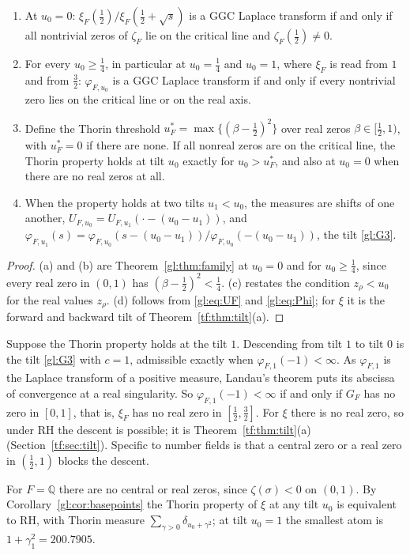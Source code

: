 \begin{corollary}\label{gl:cor:basepoints}
\begin{enumerate}
\item[(a)] At $u_0=0$: $\xi_F(\tfrac12)/\xi_F(\tfrac12+\sqrt s)$ is a GGC Laplace transform if and only if all nontrivial zeros of $\zeta_F$ lie on the critical line and $\zeta_F(\tfrac12)\neq0$.
\item[(b)] For every $u_0\ge\tfrac14$, in particular at $u_0=\tfrac14$ and $u_0=1$, where $\xi_F$ is read from $1$ and from $\tfrac32$: $\varphi_{F,u_0}$ is a GGC Laplace transform if and only if every nontrivial zero lies on the critical line or on the real axis.
\item[(c)] Define the Thorin threshold $u^*_F=\max\{(\beta-\tfrac12)^2\}$ over real zeros $\beta\in[\tfrac12,1)$, with $u_F^*=0$ if there are none. If all nonreal zeros are on the critical line, the Thorin property holds at tilt $u_0$ exactly for $u_0>u_F^*$, and also at $u_0=0$ when there are no real zeros at all.
\item[(d)] When the property holds at two tilts $u_1<u_0$, the measures are shifts of one another, $U_{F,u_0}=U_{F,u_1}(\cdot-(u_0-u_1))$, and $\varphi_{F,u_1}(s)=\varphi_{F,u_0}(s-(u_0-u_1))/\varphi_{F,u_0}(-(u_0-u_1))$, the tilt \ref{gl:G3}.
\end{enumerate}
\end{corollary}

\begin{proof}
(a) and (b) are Theorem~\ref{gl:thm:family} at $u_0=0$ and for $u_0\ge\tfrac14$, since every real zero in $(0,1)$ has $(\beta-\tfrac12)^2<\tfrac14$. (c) restates the condition $z_\rho<u_0$ for the real values $z_\rho$. (d) follows from \eqref{gl:eq:UF} and \eqref{gl:eq:Phi}; for $\xi$ it is the forward and backward tilt of Theorem~\ref{tf:thm:tilt}(a).
\end{proof}

\begin{remark}
Suppose the Thorin property holds at the tilt $1$. Descending from tilt $1$ to tilt $0$ is the tilt \ref{gl:G3} with $c=1$, admissible exactly when $\varphi_{F,1}(-1)<\infty$. As $\varphi_{F,1}$ is the Laplace transform of a positive measure, Landau's theorem \cite[Ch.~II, Theorem~5b]{Widder41} puts its abscissa of convergence at a real singularity. So $\varphi_{F,1}(-1)<\infty$ if and only if $G_F$ has no zero in $[0,1]$, that is, $\xi_F$ has no real zero in $[\tfrac12,\tfrac32]$. For $\xi$ there is no real zero, so under RH the descent is possible; it is Theorem~\ref{tf:thm:tilt}(a) (Section~\ref{tf:sec:tilt}). Specific to number fields is that a central zero or a real zero in $(\tfrac12,1)$ blocks the descent.
\end{remark}

\begin{remark}\label{gl:rem:counting}
For $F=\mathbb Q$ there are no central or real zeros, since $\zeta(\sigma)<0$ on $(0,1)$. By Corollary~\ref{gl:cor:basepoints} the Thorin property of $\xi$ at any tilt $u_0$ is equivalent to RH, with Thorin measure $\sum_{\gamma>0}\delta_{u_0+\gamma^2}$; at tilt $u_0=1$ the smallest atom is $1+\gamma_1^2=200.7905$.
\end{remark}
